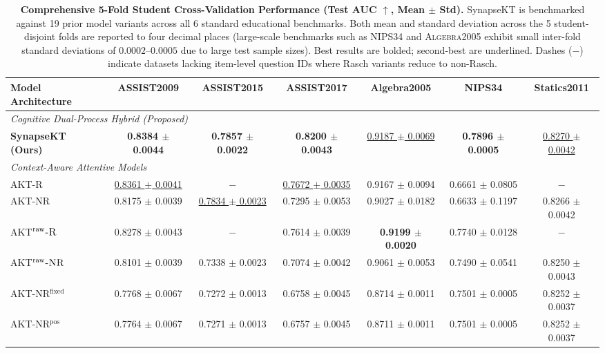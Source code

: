 \documentclass[11pt]{article}
\begin{document}
\begin{table}[t]
\centering
\footnotesize
\setlength{\tabcolsep}{2.2pt}
\caption{\textbf{Comprehensive 5-Fold Student Cross-Validation Performance (Test AUC $\uparrow$, Mean $\pm$ Std).} SynapseKT is benchmarked against 19 prior model variants across all 6 standard educational benchmarks. Both mean and standard deviation across the 5 student-disjoint folds are reported to four decimal places (large-scale benchmarks such as \textsc{NIPS34} and \textsc{Algebra2005} exhibit small inter-fold standard deviations of $0.0002$--$0.0005$ due to large test sample sizes). Best results are bolded; second-best are underlined. Dashes ($-$) indicate datasets lacking item-level question IDs where Rasch variants reduce to non-Rasch.}
\label{tab:main_benchmark}
\begin{tabular}{lcccccc}
\toprule
\textbf{Model Architecture} & \textbf{ASSIST2009} & \textbf{ASSIST2015} & \textbf{ASSIST2017} & \textbf{Algebra2005} & \textbf{NIPS34} & \textbf{Statics2011} \\
\midrule
\multicolumn{7}{l}{\emph{Cognitive Dual-Process Hybrid (Proposed)}} \\
\textbf{SynapseKT (Ours)} & \textbf{0.8384 $\pm$ 0.0044} & \textbf{0.7857 $\pm$ 0.0022} & \textbf{0.8200 $\pm$ 0.0043} & \underline{0.9187 $\pm$ 0.0069} & \textbf{0.7896 $\pm$ 0.0005} & \underline{0.8270 $\pm$ 0.0042} \\
\midrule
\multicolumn{7}{l}{\emph{Context-Aware Attentive Models}} \\
\textsc{AKT-R} & \underline{0.8361 $\pm$ 0.0041} & $-$ & \underline{0.7672 $\pm$ 0.0035} & 0.9167 $\pm$ 0.0094 & 0.6661 $\pm$ 0.0805 & $-$ \\
\textsc{AKT-NR} & 0.8175 $\pm$ 0.0039 & \underline{0.7834 $\pm$ 0.0023} & 0.7295 $\pm$ 0.0053 & 0.9027 $\pm$ 0.0182 & 0.6633 $\pm$ 0.1197 & 0.8266 $\pm$ 0.0042 \\
\textsc{AKT}$^{\text{raw}}\textsc{-R}$ & 0.8278 $\pm$ 0.0043 & $-$ & 0.7614 $\pm$ 0.0039 & \textbf{0.9199 $\pm$ 0.0020} & 0.7740 $\pm$ 0.0128 & $-$ \\
\textsc{AKT}$^{\text{raw}}\textsc{-NR}$ & 0.8101 $\pm$ 0.0039 & 0.7338 $\pm$ 0.0023 & 0.7074 $\pm$ 0.0042 & 0.9061 $\pm$ 0.0053 & 0.7490 $\pm$ 0.0541 & 0.8250 $\pm$ 0.0043 \\
\textsc{AKT-NR}$^{\text{fixed}}$ & 0.7768 $\pm$ 0.0067 & 0.7272 $\pm$ 0.0013 & 0.6758 $\pm$ 0.0045 & 0.8714 $\pm$ 0.0011 & 0.7501 $\pm$ 0.0005 & 0.8252 $\pm$ 0.0037 \\
\textsc{AKT-NR}$^{\text{pos}}$ & 0.7764 $\pm$ 0.0067 & 0.7271 $\pm$ 0.0013 & 0.6757 $\pm$ 0.0045 & 0.8711 $\pm$ 0.0011 & 0.7501 $\pm$ 0.0005 & 0.8252 $\pm$ 0.0037 \\

\end{tabular}
\end{table}
\end{document}

